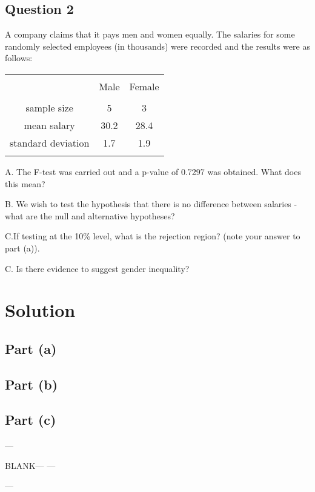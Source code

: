 




\subsection*{Question 2}
A company claims that it pays men and women equally. The salaries for some randomly selected employees (in thousands) were recorded and the results were as follows:\\
\begin{center}
\begin{tabular}{|c|c|c|}
\hline
&&\\[-0.4cm]
& Male & Female \\
\hline
&&\\[-0.4cm]
sample size & 5 & 3 \\
mean salary & 30.2 & 28.4 \\
standard deviation & 1.7 & 1.9 \\
\hline
\multicolumn{3}{c}{}\\[-0.3cm]
\end{tabular}
\end{center}


A. The F-test was carried out and a p-value of 0.7297 was obtained. What does this mean? 

B. We wish to test the hypothesis that there is no difference between salaries - what are the null and alternative hypotheses? 

C.If testing at the 10\% level, what is the rejection region? (note your answer to part (a)). 

C. Is there evidence to suggest gender inequality?

\section*{Solution}

\subsection*{Part (a)}

\subsection*{Part (b)}

\subsection*{Part (c)}	
---

BLANK---
---

---	
